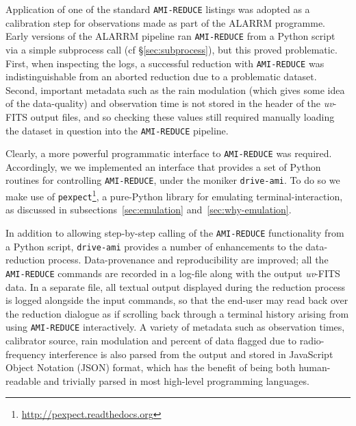 \documentclass[5p,authoryear]{elsarticle}
\begin{document}
Application of one of the standard \texttt{AMI-REDUCE} listings was adopted as a calibration step for observations made as part of the ALARRM programme. 
Early versions of the ALARRM pipeline ran \texttt{AMI-REDUCE} from a Python script via a simple subprocess call (cf \S\ref{sec:subprocess}), but this proved problematic. 
First, when inspecting the logs, a successful reduction with \texttt{AMI-REDUCE} was indistinguishable from an aborted reduction due to a problematic dataset. 
Second, important metadata such as the rain modulation (which gives some idea of the data-quality) and observation time is not stored in the header of the \textit{uv}-FITS output files, and so checking these values still required manually loading the dataset in question into the \texttt{AMI-REDUCE} pipeline. 

Clearly, a more powerful programmatic interface to \texttt{AMI-REDUCE} was required. 
Accordingly, we we implemented an interface that provides a set of Python routines for controlling \texttt{AMI-REDUCE}, under the moniker \texttt{drive-ami}. 
To do so we make use of 
\texttt{pexpect}\footnote{%
\url{http://pexpect.readthedocs.org}}, 
a pure-Python library for emulating terminal-interaction, as discussed in subsections~\ref{sec:emulation} and~\ref{sec:why-emulation}.  

In addition to allowing step-by-step calling of the \texttt{AMI-REDUCE} functionality from a Python script, \texttt{drive-ami} provides a number of enhancements to the data-reduction process.
Data-provenance and reproducibility are improved; all the \texttt{AMI-REDUCE} commands are recorded in a log-file along with the output \textit{uv}-FITS data. 
In a separate file, all textual output displayed during the reduction process is logged alongside the input commands, so that the end-user may read back over the reduction dialogue as if scrolling back through a terminal history arising from using \texttt{AMI-REDUCE} interactively. 
A variety of metadata such as observation times, calibrator source, rain modulation and percent of data flagged due to radio-frequency interference is also parsed from the output and stored in JavaScript Object Notation (JSON) format, which has the benefit of being both human-readable and trivially parsed in most high-level programming languages. 
\end{document}
